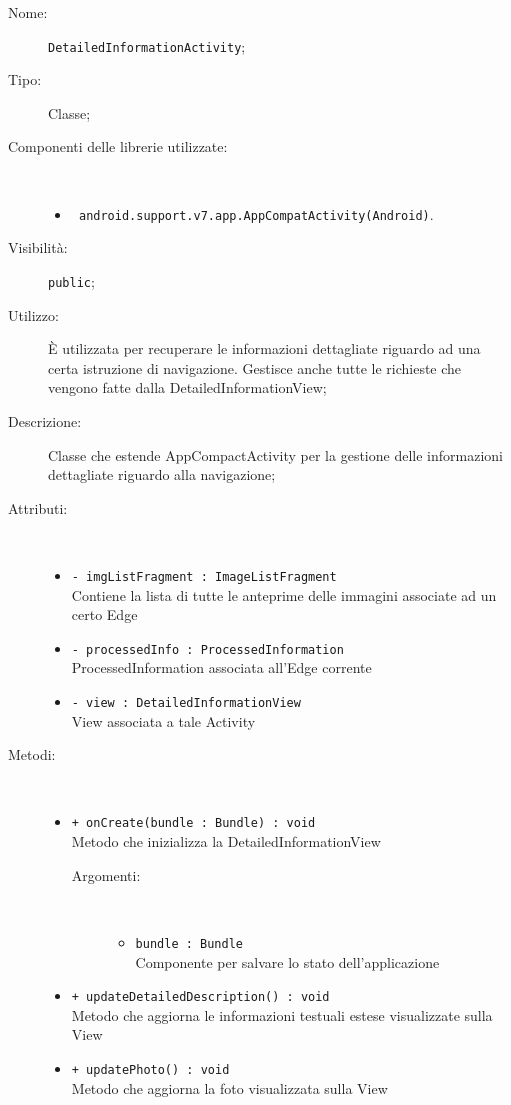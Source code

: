 \documentclass[../DefinizioneDiProdotto.tex]{subfiles}
\begin{document}
    \begin{description}
\item[Nome:] \texttt{DetailedInformationActivity};
\item[Tipo:] Classe;
\item[Componenti delle librerie utilizzate:] \
\begin{itemize}
\item \texttt{ android.support.v7.app.AppCompatActivity(Android)}.

\end{itemize}
\item[Visibilità:] \texttt{public};
\item[Utilizzo:] È utilizzata per recuperare le informazioni dettagliate riguardo ad una certa istruzione di navigazione. Gestisce anche tutte le richieste che vengono fatte dalla DetailedInformationView;
\item[Descrizione:] Classe che estende AppCompactActivity per la gestione delle informazioni dettagliate riguardo alla navigazione;
\item[Attributi:] \
\begin{itemize}
\item \texttt{- imgListFragment : ImageListFragment}\\
Contiene la lista di tutte le anteprime delle immagini associate ad un certo Edge

\item \texttt{- processedInfo : ProcessedInformation}\\
ProcessedInformation associata all'Edge corrente

\item \texttt{- view : DetailedInformationView}\\
View associata a tale Activity

\end{itemize}
\item[Metodi:] \
\begin{itemize}
\item \texttt{+ onCreate(bundle : Bundle) : void}\\
Metodo che inizializza la DetailedInformationView
 \begin{description}
\item[Argomenti:] \
\begin{itemize}
\item \texttt{bundle : Bundle}\\
Componente per salvare lo stato dell'applicazione\end{itemize}
\end{description}
\item \texttt{+ updateDetailedDescription() : void}\\
Metodo che aggiorna le informazioni testuali estese visualizzate sulla View
 \item \texttt{+ updatePhoto() : void}\\
Metodo che aggiorna la foto visualizzata sulla View
 \end{itemize}
\end{description}
\end{document}
